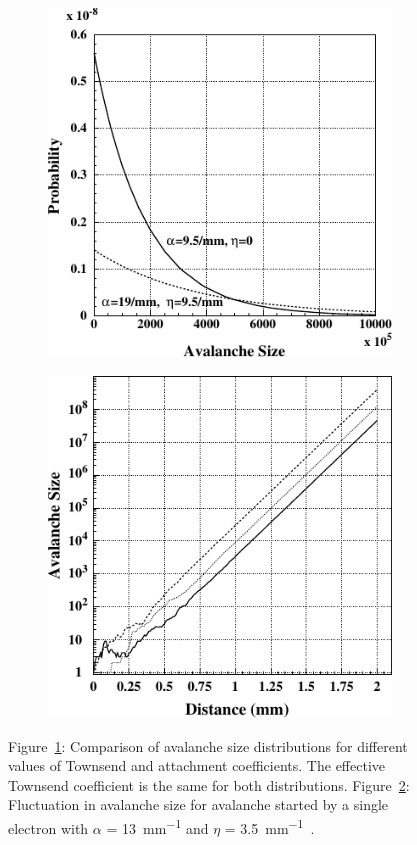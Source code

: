 	\begin{figure}[H]
		\begin{subfigure}{0.5\linewidth}
			\centering
			\includegraphics[width = 0.5\plotwidth]{fig/chapt4/Riegler-distrib.pdf}
			\caption{\label{fig:RVL:A}}
		\end{subfigure}
		\begin{subfigure}{0.5\linewidth}
			\centering
			\includegraphics[width = 0.5\plotwidth]{fig/chapt4/Riegler-fluctuations.pdf}
			\caption{\label{fig:RVL:B}}
		\end{subfigure}
		\caption{\label{fig:RVL} Figure~\ref{fig:RVL:A}: Comparison of avalanche size distributions for different values of Townsend and attachment coefficients. The effective Townsend coefficient is the same for both distributions. Figure~\ref{fig:RVL:B}: Fluctuation in avalanche size for avalanche started by a single electron with $\alpha$ = \SI{13}{mm^{-1}} and $\eta$ = \SI{3.5}{mm^{-1}}~\cite{RIEGLER2003}.}
	\end{figure}
		
